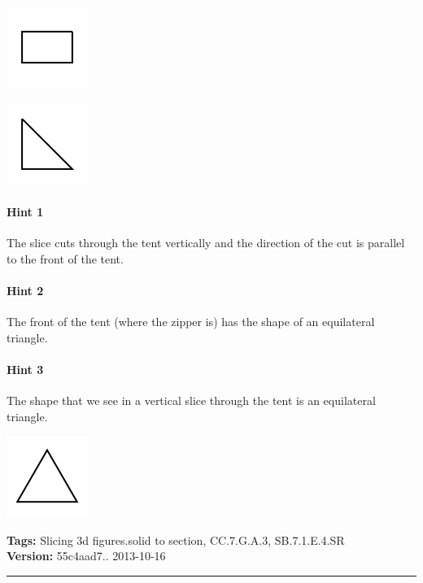 \documentclass[twocolumn,10pt]{article}
\def\shrinkfactor{0.4}
\begin{document}
\includegraphics[scale=\shrinkfactor]{figures/0e5042b475e0847d67b74c0482f8e8173f798656.png}


\includegraphics[scale=\shrinkfactor]{figures/02361468f7d85874956214c7a0a119b84a8c2651.png}



\paragraph{Hint 1}The slice cuts through the tent vertically and the direction of the cut is parallel to the front of the tent.

\paragraph{Hint 2}The front of the tent (where the zipper is) has the shape of an equilateral triangle.

\paragraph{Hint 3}The shape that we see in a vertical slice through the tent is an equilateral triangle.   

\includegraphics[scale=\shrinkfactor]{figures/15c855a8a232e6c1873c5f46769050a9c13051b8.png}



\medskip
\noindent
\textbf{Tags:} {\footnotesize Slicing 3d figures.solid to section, CC.7.G.A.3, SB.7.1.E.4.SR}\\
\textbf{Version:} 55c4aad7.. 2013-10-16
\smallskip\hrule
\end{document}
